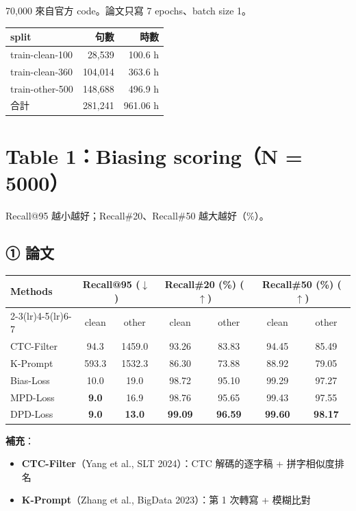 \documentclass[11pt,a4paper]{article}
\begin{document}
70,000 來自官方 code。論文只寫 7 epochs、batch size 1。

{\small
\begin{tabular}{lrr}
\toprule
split & 句數 & 時數 \\
\midrule
train-clean-100 & 28,539 & 100.6 h \\
train-clean-360 & 104,014 & 363.6 h \\
train-other-500 & 148,688 & 496.9 h \\
\midrule
合計 & 281,241 & 961.06 h \\
\bottomrule
\end{tabular}
}

\clearpage
\section*{Table 1：Biasing scoring（N = 5000）}

Recall@95 越小越好；Recall\#20、Recall\#50 越大越好（\%）。

\subsection*{① 論文}

\begin{center}
\begin{tabular}{lcccccc}
\toprule
\multirow{2}{*}{\textbf{Methods}} & \multicolumn{2}{c}{\textbf{Recall@95} ($\downarrow$)} & \multicolumn{2}{c}{\textbf{Recall\#20} (\%) ($\uparrow$)} & \multicolumn{2}{c}{\textbf{Recall\#50} (\%) ($\uparrow$)} \\
\cmidrule(lr){2-3}\cmidrule(lr){4-5}\cmidrule(lr){6-7}
 & clean & other & clean & other & clean & other \\
\midrule
CTC-Filter & 94.3 & 1459.0 & 93.26 & 83.83 & 94.45 & 85.49 \\
K-Prompt   & 593.3 & 1532.3 & 86.30 & 73.88 & 88.92 & 79.05 \\
\midrule
Bias-Loss  & 10.0 & 19.0 & 98.72 & 95.10 & 99.29 & 97.27 \\
MPD-Loss   & \textbf{9.0} & 16.9 & 98.76 & 95.65 & 99.43 & 97.55 \\
DPD-Loss   & \textbf{9.0} & \textbf{13.0} & \textbf{99.09} & \textbf{96.59} & \textbf{99.60} & \textbf{98.17} \\
\bottomrule
\end{tabular}
\end{center}

\textbf{補充}：
\begin{itemize}[leftmargin=1.5em, itemsep=0pt]
  \item \textbf{CTC-Filter}（Yang et al., SLT 2024）：CTC 解碼的逐字稿 + 拼字相似度排名
  \item \textbf{K-Prompt}（Zhang et al., BigData 2023）：第 1 次轉寫 + 模糊比對
\end{itemize}
\end{document}
